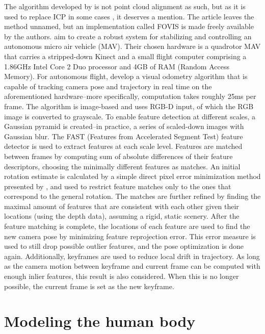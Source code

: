 The algorithm developed by \citet{huang2011visual} is not point cloud alignment as such, but as it is used to replace ICP in some cases \citep{Whelan12rssw}, it deserves a mention. The article leaves the method unnamed, but an implementation called FOVIS \citep{fovis} is made freely available by the authors. \citet{huang2011visual} aim to create a robust system for stabilizing and controlling an autonomous micro air vehicle (MAV). Their chosen hardware is a quadrotor MAV that carries a stripped-down Kinect and a small flight computer comprising a 1.86GHz Intel Core 2 Duo processor and 4GB of RAM (Random Access Memory). For autonomous flight, \citeauthor{huang2011visual} develop a visual odometry algorithm that is capable of tracking camera pose and trajectory in real time on the aforementioned hardware--more specifically, computation takes roughly 25ms per frame. The algorithm is image-based and uses RGB-D input, of which the RGB image is converted to grayscale. To enable feature detection at different scales, a Gaussian pyramid is created--in practice, a series of scaled-down images with Gaussian blur. The FAST (Features from Accelerated Segment Test) feature detector \citep{rosten2006machine} is used to extract features at each scale level. Features are matched between frames by computing sum of absolute differences of their feature descriptors, choosing the minimally different features as matches. An initial rotation estimate is calculated by a simple direct pixel error minimization method presented by \citet{mei2009}, and used to restrict feature matches only to the ones that correspond to the general rotation. The matches are further refined by finding the maximal amount of features that are consistent with each other given their locations (using the depth data), assuming a rigid, static scenery. After the feature matching is complete, the locations of each feature are used to find the new camera pose by minimizing feature reprojection error. This error measure is used to still drop possible outlier features, and the pose optimization is done again. Additionally, keyframes are used to reduce local drift in trajectory. As long as the camera motion between keyframe and current frame can be computed with enough inlier features, this result is also considered. When this is no longer possible, the current frame is set as the new keyframe. \citep{huang2011visual}


\section{Modeling the human body}

